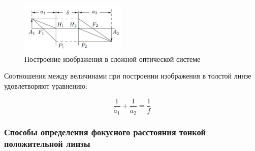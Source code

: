 	\begin{figure}
		\includegraphics[width = 0.45\textwidth]{images/image_in_thick_lense.png}
		\caption{Построение изображения в сложной оптической системе}
		\label{fig:image_in_thick_lense}
	\end{figure}

	Соотношения между величинами при построении изображения в толстой линзе удовлетворяют уравнению:
	
	\begin{equation} \label{eq:thin_lense_eq}
		\frac{1}{a_1} + \frac{1}{a_2} = \frac{1}{f}
	\end{equation}
	
	\subsubsection*{Способы определения фокусного расстояния тонкой положительной линзы}
	
